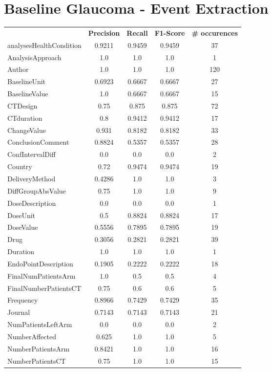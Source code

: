 \section{Baseline Glaucoma - Event Extraction}
\begin{longtable}{ l c c c c}
 & \textbf{Precision} & \textbf{Recall} & \textbf{F1-Score} & \textbf{\# occurences} \\ \cline{1-5}
analysesHealthCondition & 0.9211 & 0.9459 & 0.9459 & 37\\
AnalysisApproach & 1.0 & 1.0 & 1.0 & 1\\
Author & 1.0 & 1.0 & 1.0 & 120\\
BaselineUnit & 0.6923 & 0.6667 & 0.6667 & 27\\
BaselineValue & 1.0 & 0.6667 & 0.6667 & 15\\
CTDesign & 0.75 & 0.875 & 0.875 & 72\\
CTduration & 0.8 & 0.9412 & 0.9412 & 17\\
ChangeValue & 0.931 & 0.8182 & 0.8182 & 33\\
ConclusionComment & 0.8824 & 0.5357 & 0.5357 & 28\\
ConfIntervalDiff & 0.0 & 0.0 & 0.0 & 2\\
Country & 0.72 & 0.9474 & 0.9474 & 19\\
DeliveryMethod & 0.4286 & 1.0 & 1.0 & 3\\
DiffGroupAbsValue & 0.75 & 1.0 & 1.0 & 9\\
DoseDescription & 0.0 & 0.0 & 0.0 & 1\\
DoseUnit & 0.5 & 0.8824 & 0.8824 & 17\\
DoseValue & 0.5556 & 0.7895 & 0.7895 & 19\\
Drug & 0.3056 & 0.2821 & 0.2821 & 39\\
Duration & 1.0 & 1.0 & 1.0 & 1\\
EndoPointDescription & 0.1905 & 0.2222 & 0.2222 & 18\\
FinalNumPatientsArm & 1.0 & 0.5 & 0.5 & 4\\
FinalNumberPatientsCT & 0.75 & 0.6 & 0.6 & 5\\
Frequency & 0.8966 & 0.7429 & 0.7429 & 35\\
Journal & 0.7143 & 0.7143 & 0.7143 & 21\\
NumPatientsLeftArm & 0.0 & 0.0 & 0.0 & 2\\
NumberAffected & 0.625 & 1.0 & 1.0 & 5\\
NumberPatientsArm & 0.8421 & 1.0 & 1.0 & 16\\
NumberPatientsCT & 0.75 & 1.0 & 1.0 & 15\\

\end{longtable}
